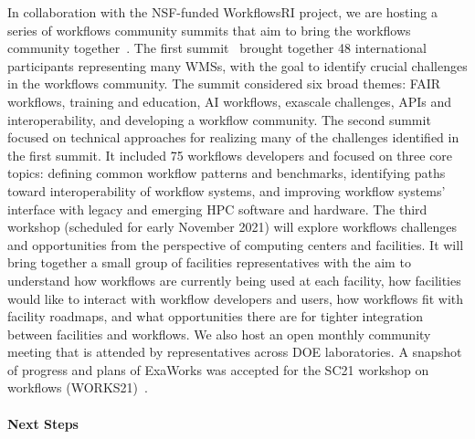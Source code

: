 In collaboration with the NSF-funded WorkflowsRI project, we are hosting a
series of workflows community summits that aim to bring the workflows
community together~\cite{dasilva2021community}. The first
summit~\cite{summit-1} brought together 48 international participants
representing many WMSs, with the goal to identify crucial challenges in the
workflows community. The summit considered six broad themes: FAIR workflows,
training and education, AI workflows, exascale challenges, APIs and
interoperability, and developing a workflow community. The second
summit~\cite{summit-2} focused on technical approaches for realizing many of
the challenges identified in the first summit. It included 75 workflows
developers %
and focused on three core topics: defining common workflow patterns and
benchmarks, identifying paths toward interoperability of workflow systems, and
improving workflow systems' interface with legacy and emerging HPC software
and hardware. The third workshop (scheduled for early November 2021) will
explore workflows challenges and opportunities from the perspective of
computing centers and facilities.  It will bring together a small group of
facilities representatives with the aim to understand how workflows are
currently being used at each facility, how facilities would like to interact
with workflow developers and users, how workflows fit with facility roadmaps,
and what opportunities there are for tighter integration between facilities
and workflows. We also host an open monthly community meeting that is attended
by representatives across DOE laboratories. A snapshot of progress and plans
of ExaWorks was accepted for the SC21 workshop on workflows
(WORKS21)~\cite{alsaadi2021exaworks}.


\paragraph{Next Steps}


